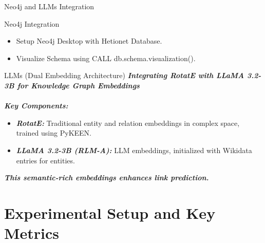 \documentclass{beamer}
\begin{document}
\begin{frame}{Neo4j and LLMs Integration}

    \begin{block}{Neo4j Integration}
        \begin{itemize}
            \item \small Setup Neo4j Desktop with Hetionet Database.
            \item \small Visualize Schema using \tiny CALL db.schema.visualization().
        \end{itemize}
    \end{block}

    \begin{block}{LLMs (Dual Embedding Architecture)}
        \small \textbf{\textit{Integrating RotatE with LLaMA 3.2-3B for Knowledge Graph Embeddings\\}}
        \textbf{\textit{\small \\Key Components:}}

        \begin{itemize}
            \item \textbf{\textit{\small RotatE:}} Traditional entity and relation embeddings in complex space, trained using PyKEEN.
            \item \textbf{\textit{\small LLaMA 3.2-3B (RLM-A):}} LLM embeddings, initialized with Wikidata entries for entities.
        \end{itemize}
        \textbf{\textit{This semantic-rich embeddings enhances link prediction.}}

    \end{block}

\end{frame}


\section{Experimental Setup and Key Metrics}
\end{document}
